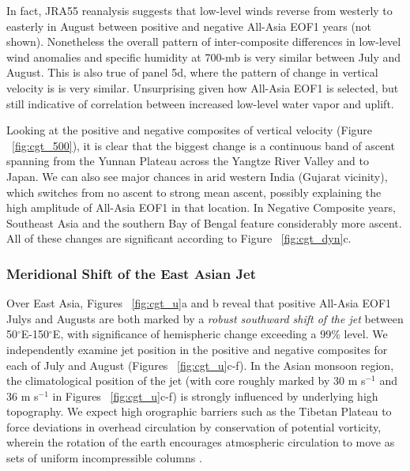	In fact, JRA55 reanalysis suggests that low-level winds reverse from westerly to easterly in August between positive and negative All-Asia EOF1 years (not shown). Nonetheless the overall pattern of inter-composite differences in low-level wind anomalies and specific humidity at 700-mb is very similar between July and August. This is also true of panel 5d, where the pattern of change in vertical velocity is is very similar. Unsurprising given how All-Asia EOF1 is selected, but still indicative of correlation between increased low-level water vapor and uplift.
			
	Looking at the positive and negative composites of vertical velocity (Figure ~\ref{fig:cgt_500}), it is clear that the biggest change is a continuous band of ascent spanning from the Yunnan Plateau across the Yangtze River Valley and to Japan. We can also see major chances in arid western India (Gujarat vicinity), which switches from no ascent to strong mean ascent, possibly explaining the high amplitude of All-Asia EOF1 in that location. In Negative Composite years, Southeast Asia and the southern Bay of Bengal feature considerably more ascent. All of these changes are significant according to Figure ~\ref{fig:cgt_dyn}c.
	
\subsubsection{Meridional Shift of the East Asian Jet}

	Over East Asia, Figures ~\ref{fig:cgt_u}a and b reveal that positive All-Asia EOF1 Julys and Augusts are both marked by a \textit{robust southward shift of the jet} between 50$^{\circ}$E-150$^{\circ}$E, with significance of hemispheric change exceeding a 99\% level. We independently examine jet position in the positive and negative composites for each of July and August (Figures  ~\ref{fig:cgt_u}c-f). In the Asian monsoon region, the climatological position of the jet (with core roughly marked by 30 m s$^{-1}$ and 36 m s$^{-1}$ in Figures ~\ref{fig:cgt_u}c-f) is strongly influenced by underlying high topography. We expect high orographic barriers such as the Tibetan Plateau to force deviations in overhead circulation by conservation of potential vorticity, wherein the rotation of the earth encourages atmospheric circulation to move as sets of uniform incompressible columns \citep{Holton2004a}.
	
